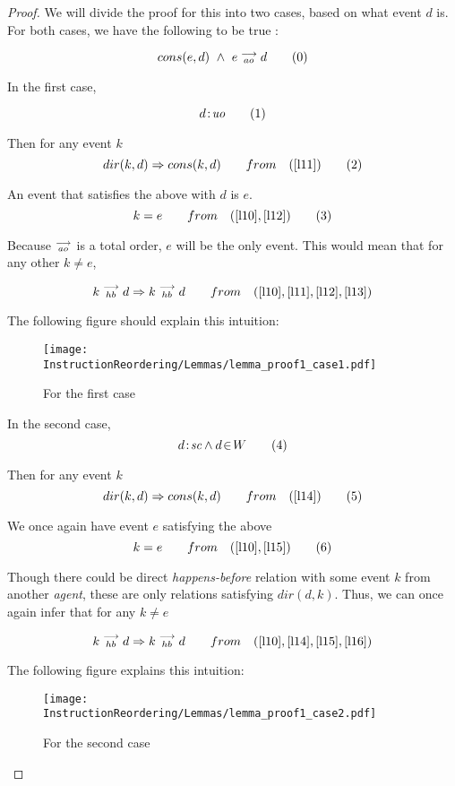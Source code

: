 \begin{proof}
    
    We will divide the proof for this into two cases, based on what event $d$ is. For both cases, we have the following to be true :
    
    \[
        cons(e,d) \ \wedge \ e\stackrel{\longrightarrow}{_{ao}}d
        \tag{0}
        \label{l10}
    \]

    In the first case, 
    
    \[
        d\!:\!\textit{uo} 
        \tag{1}
        \label{l11}
    \]
    
    Then for any event $k$
    \[
        dir(k,d) \Rightarrow cons(k,d)
        \qquad from \quad
        (\ref{l11})
        \tag{2}
        \label{l12}
    \]
    
    An event that satisfies the above with $d$ is $e$.
    \[
         k = e  
         \qquad from \quad
         (\ref{l10}, \ref{l12})
         \tag{3}
         \label{l13}
    \]
    
    Because $\stackrel{\longrightarrow}{_{ao}}$ is a total order, $e$ will be the only event. This would mean that for any other $k \neq e$,
    
    \[
        k\stackrel{\longrightarrow}{_{hb}}d \Rightarrow k\stackrel{\longrightarrow}{_{hb}}d
        \qquad from \quad
        (\ref{l10}, \ref{l11}, \ref{l12}, \ref{l13}) 
    \]
    
    The following figure should explain this intuition:  
    \begin{figure}[H]
        \centering
        \texttt{[image: InstructionReordering/Lemmas/lemma\_proof1\_case1.pdf]}
        \caption{For the first case}
        \label{fig:my_label}
    \end{figure}
    
    In the second case,
    \[
        d\!:\!\textit{sc} \wedge d\!\in\!W
        \tag{4}
        \label{l14}
    \]
    
    Then for any event $k$
    \[
        dir(k,d) \Rightarrow cons(k,d)
        \qquad from \quad
        (\ref{l14})
        \tag{5}
        \label{l15}
    \]
    
    We once again have event $e$ satisfying the above
    \[
        k = e 
        \qquad from \quad
        (\ref{l10}, \ref{l15})
        \tag{6}
        \label{l16}
    \]
    
    Though there could be direct \textit{happens-before} relation with some event $k$ from another \textit{agent}, these are only relations satisfying $dir(d,k)$. Thus, we can once again infer that for any $k \neq e$ 
    
    \[
        k\stackrel{\longrightarrow}{_{hb}}d \Rightarrow k\stackrel{\longrightarrow}{_{hb}}d
        \qquad from \quad
        (\ref{l10}, \ref{l14}, \ref{l15}, \ref{l16})
    \]
    
    The following figure explains this intuition: 
    
    \begin{figure}[H]
        \centering
        \texttt{[image: InstructionReordering/Lemmas/lemma\_proof1\_case2.pdf]}
        \caption{For the second case}
        \label{fig:my_label}
    \end{figure}
    
\end{proof}

